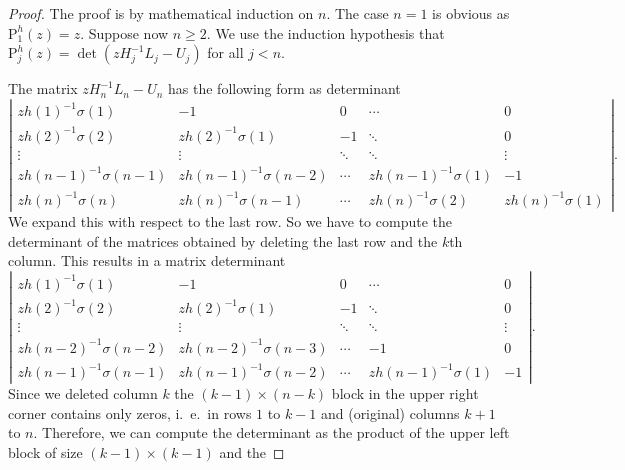 \documentclass[10pt,a4paper]{amsart}
\newcommand{\pol}{\mathrm{P}}
\begin{document}
\begin{proof}
The proof is by mathematical induction on $n$.
The case $n=1$ is obvious as $\pol _{1}^{h}\left( z\right) =z$.
Suppose now $n\geq 2$.
We use
the induction hypothesis that
$\pol _{j}^{h}\left( z\right) =\det \left( zH_{j}^{-1}L_{j}-U_{j}\right) $
for all $j<n$.

The matrix $zH_{n}^{-1}L_{n}-U_{n}$ has the following form as determinant
\[
\left|
\begin{array}{ccccc}
zh\left( 1\right) ^{-1}\sigma \left( 1\right) &-1
&0
&\cdots &0\\
zh\left( 2\right) ^{-1}\sigma \left( 2\right)
&zh\left( 2\right) ^{-1}\sigma \left( 1\right) &-1
&\ddots &0\\
\vdots &\vdots
&\ddots &\ddots &\vdots \\
zh\left( n-1\right) ^{-1}\sigma \left( n-1\right)
&zh\left( n-1\right) ^{-1}\sigma \left( n-2\right) &\cdots
&zh\left( n-1\right) ^{-1}\sigma \left( 1\right) &-1\\
zh\left( n\right) ^{-1}\sigma \left( n\right)
&zh\left( n\right) ^{-1}\sigma \left( n-1\right) &\cdots
&zh\left( n\right) ^{-1}\sigma \left( 2\right)
&zh\left( n\right) ^{-1}\sigma \left( 1\right)
\end{array}
\right| .
\]
We expand this with respect to the last row. So we have to compute the
determinant of the matrices obtained by
deleting
the last row and
the $k$th
column. This results in a matrix determinant
\[
\left|
\begin{array}{ccccc}
zh\left( 1\right) ^{-1}\sigma \left( 1\right) &-1
&0&\cdots
&0\\
zh\left( 2\right) ^{-1}\sigma \left( 2\right)
&zh\left( 2\right) ^{-1}\sigma \left( 1\right)
&-1&\ddots
&0\\
\vdots &\vdots
&\ddots
&\ddots &\vdots \\
zh\left( n-2\right) ^{-1}\sigma \left( n-2\right)
&zh\left( n-2\right) ^{-1}\sigma \left( n-3\right) &\cdots
&-1&0\\
zh\left( n-1\right) ^{-1}\sigma \left( n-1\right)
&zh\left( n-1\right) ^{-1}\sigma \left( n-2\right) &\cdots
&zh\left( n-1\right) ^{-1}\sigma \left( 1\right) &-1
\end{array}
\right| .
\]
Since we deleted column $k$
the
$\left( k-1\right) \times \left( n-k\right) $ block in the upper right corner
contains only zeros, i.~e.\ in rows $1$ to $k-1$ and (original) columns $k+1$ to
$n$. Therefore, we can compute the determinant as the product of the upper
left block of size $\left( k-1\right) \times \left( k-1\right) $ and the

\end{proof}
\end{document}
